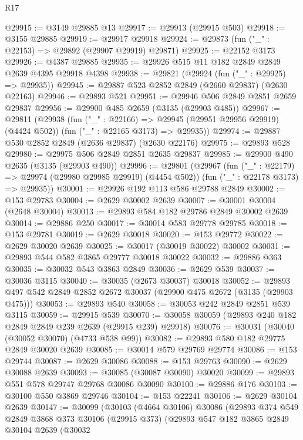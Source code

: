 \begin{lexlean}{R17}
\begin{coremodule}
@29915 := @3149 @29885 @13
@29917 := @29913 (@29915 @503)
@29918 := @3155 @29885
@29919 := @29917 @29918
@29924 := @29873 (fun ("_" : @22153) => @29892 (@29907 @29919) @29871)
@29925 := @22152 @3173
@29926 := @4387 @29885
@29935 := @29926 @515 @11 @182 @2849 @2849 @2639 @4395 @29918 @4398
@29938 := @29821 (@29924 (fun ("_" : @29925) => @29935))
@29945 := @29887 @523 @2852 @2849 (@2660 @29837) (@2630 @22163)
@29946 := @29893 @521
@29951 := @29946 @506 @2849 @2851 @2659 @29837
@29956 := @29900 @485 @2659 (@3135 (@29903 @485))
@29967 := @29811
    (@29938
      (fun ("_" : @22166) => @29945 (@29951 @29956 @29919) (@4424 @502))
      (fun ("_" : @22165 @3173) => @29935))
@29974 := @29887 @530 @2852 @2849 (@2636 @29837) (@2630 @22176)
@29975 := @29893 @528
@29980 := @29975 @506 @2849 @2851 @2635 @29837
@29985 := @29900 @490 @2635 (@3135 (@29903 @490))
@29996 := @29801
    (@29967
      (fun ("_" : @22179) => @29974 (@29980 @29985 @29919) (@4454 @502))
      (fun ("_" : @22178 @3173) => @29935))
@30001 := @29926 @192 @113 @586 @29788 @2849
@30002 := @153 @29783
@30004 := @2629 @30002 @2639
@30007 := @30001 @30004 (@2648 @30004)
@30013 := @29893 @584 @182 @29786 @2849 @30002 @2639
@30014 := @29886 @250
@30017 := @30014 @583 @29778 @29785
@30018 := @153 @29781
@30019 := @2629 @30018
@30020 := @153 @29772
@30022 := @2629 @30020 @2639
@30025 := @30017 (@30019 @30022) @30002
@30031 := @29893 @544 @582 @3865 @29777 @30018 @30022
@30032 := @29886 @363
@30035 := @30032 @543 @3863 @2849
@30036 := @2629 @539
@30037 := @30036 @3115
@30040 := @30035 (@2673 @30037) @30018
@30052 := @29893 @497 @542 @2849 @2852 @2672 @30037 (@29900 @475 @2672 (@3135 (@29903 @475)))
@30053 := @29893 @540
@30058 := @30053 @242 @2849 @2851 @539 @3115
@30059 := @29915 @539
@30070 := @30058 @30059 (@29893 @240 @182 @2849 @2849 @239 @2639 (@29915 @239) @29918)
@30076 := @30031 (@30040 (@30052 @30070) (@4733 @538 @99))
@30082 := @29893 @580 @182 @29775 @2849 @30020 @2639
@30085 := @30014 @579 @29769 @29774
@30086 := @153 @29744
@30087 := @2629 @30086
@30088 := @153 @29763
@30090 := @2629 @30088 @2639
@30093 := @30085 (@30087 @30090) @30020
@30099 := @29893 @551 @578 @29747 @29768 @30086 @30090
@30100 := @29886 @176
@30103 := @30100 @550 @3869 @29746
@30104 := @153 @22241
@30106 := @2629 @30104 @2639
@30147 := @30099
    (@30103
      (@4664 @30106)
      @30086
      (@29893
        @374
        @549
        @2849
        @3868
        @373
        @30106
        (@29915 @373)
        (@29893
          @547
          @182
          @3865
          @2849
          @30104
          @2639
          (@30032

\end{coremodule}
\end{lexlean}
